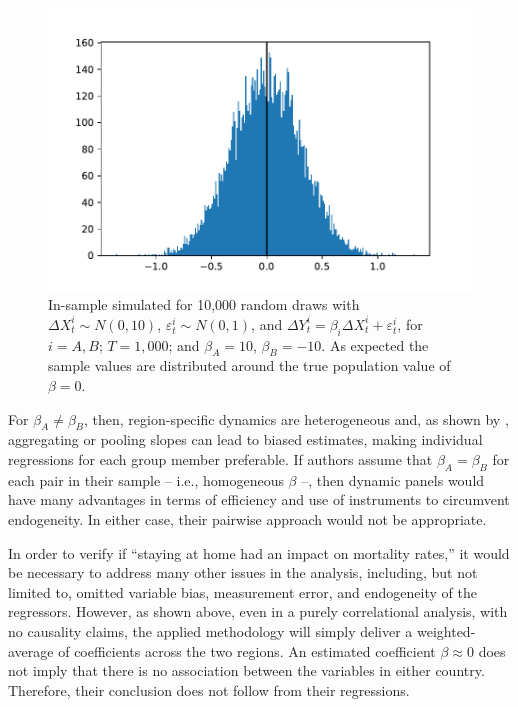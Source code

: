 \documentclass{article}
\theoremstyle{lemma}
\begin{document}
\begin{figure}
    \centering
    \includegraphics[scale=0.75]{histogram.pdf}
    \caption{In-sample simulated \hat{\beta} for 10,000 random draws with $\Delta X_t^i \sim N(0,10)$, $\varepsilon_t^i \sim N(0,1)$, and $\Delta Y_t^i = \beta_i \Delta X_t^i + \varepsilon^i_t$, for $i = A, B$; $T=1,000$; and $\beta_A =10$, $\beta_B = -10$. As expected the sample values are distributed around the true population value of $\beta=0$.}
\end{figure}

For $\beta_A \neq \beta_B$, then, region-specific dynamics are heterogeneous and, as shown by \textcite{pesaran}, aggregating or pooling slopes can lead to biased estimates, making individual regressions for each group member preferable. If authors assume that $\beta_A = \beta_B$ for each pair in their sample -- i.e., homogeneous $\beta$ --, then dynamic panels would have many advantages in terms of efficiency and use of instruments to circumvent endogeneity. In either case, their pairwise approach would not be appropriate.

In order to verify if ``staying at home had an impact on mortality rates,'' it would be necessary to address many other issues in the analysis, including, but not limited to, omitted variable bias, measurement error, and endogeneity of the regressors. However, as shown above, even in a purely correlational analysis, with no causality claims, the applied methodology will simply deliver a weighted-average of coefficients across the two regions. An estimated coefficient $\beta \approx 0$ does not imply that there is no association between the variables in either country. Therefore, their conclusion does not follow from their regressions.
\end{document}
